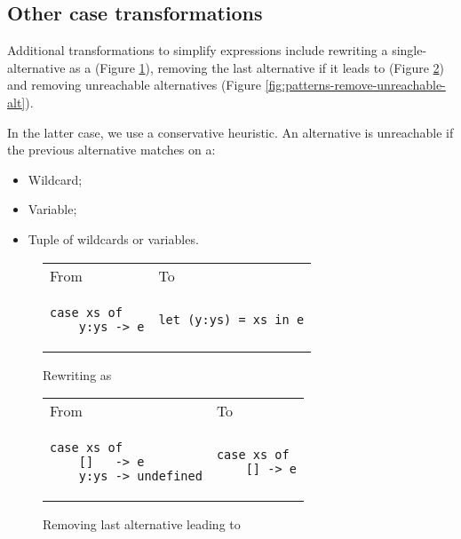 \subsection{Other case transformations}

Additional transformations to simplify  expressions include rewriting a single-alternative  as a  (Figure \ref{fig:patterns-rewrite-case-let}), removing the last alternative if it leads to  (Figure \ref{fig:patterns-remove-undefined-alt}) and removing unreachable alternatives (Figure \ref{fig:patterns-remove-unreachable-alt}).

In the latter case, we use a conservative heuristic. An alternative is unreachable if the previous alternative matches on a:

\begin{itemize}
\item Wildcard;
\item Variable;
\item Tuple of wildcards or variables.
\end{itemize}

\begin{figure}
\centering
\begin{tabular}{>{\centering\arraybackslash}m{10em} >{\centering\arraybackslash}m{10em} }
From & To \\
\begin{verbatim}
case xs of
    y:ys -> e
\end{verbatim}
& \begin{verbatim}
let (y:ys) = xs in e
\end{verbatim}
\end{tabular}
\caption{Rewriting  as }
\label{fig:patterns-rewrite-case-let}
\end{figure}

\begin{figure}
\centering
\begin{tabular}{>{\centering\arraybackslash}m{12em} >{\centering\arraybackslash}m{8em} }
From & To \\
\begin{verbatim}
case xs of
    []   -> e
    y:ys -> undefined
\end{verbatim}
& \begin{verbatim}
case xs of
    [] -> e
\end{verbatim}
\end{tabular}
\caption{Removing last alternative leading to }
\label{fig:patterns-remove-undefined-alt}
\end{figure}

